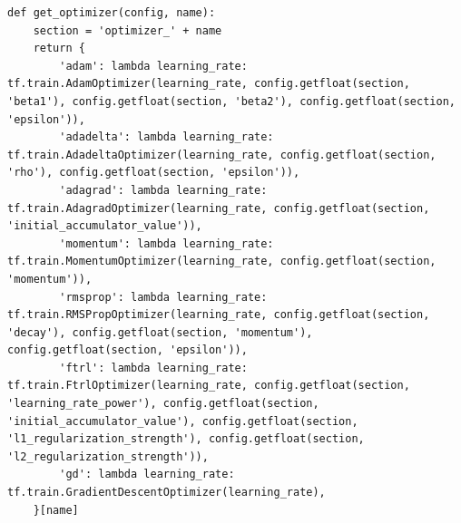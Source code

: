 \begin{lstlisting}
def get_optimizer(config, name):
    section = 'optimizer_' + name
    return {
        'adam': lambda learning_rate: tf.train.AdamOptimizer(learning_rate, config.getfloat(section, 'beta1'), config.getfloat(section, 'beta2'), config.getfloat(section, 'epsilon')),
        'adadelta': lambda learning_rate: tf.train.AdadeltaOptimizer(learning_rate, config.getfloat(section, 'rho'), config.getfloat(section, 'epsilon')),
        'adagrad': lambda learning_rate: tf.train.AdagradOptimizer(learning_rate, config.getfloat(section, 'initial_accumulator_value')),
        'momentum': lambda learning_rate: tf.train.MomentumOptimizer(learning_rate, config.getfloat(section, 'momentum')),
        'rmsprop': lambda learning_rate: tf.train.RMSPropOptimizer(learning_rate, config.getfloat(section, 'decay'), config.getfloat(section, 'momentum'), config.getfloat(section, 'epsilon')),
        'ftrl': lambda learning_rate: tf.train.FtrlOptimizer(learning_rate, config.getfloat(section, 'learning_rate_power'), config.getfloat(section, 'initial_accumulator_value'), config.getfloat(section, 'l1_regularization_strength'), config.getfloat(section, 'l2_regularization_strength')),
        'gd': lambda learning_rate: tf.train.GradientDescentOptimizer(learning_rate),
    }[name]



\end{lstlisting}
